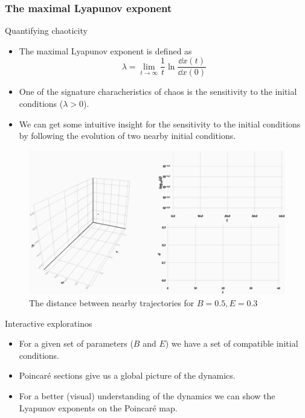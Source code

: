 \documentclass{beamer}
\begin{document}
\subsubsection{The maximal Lyapunov exponent}


\begin{frame}{Quantifying chaoticity}
	\begin{itemize}
		\item The maximal Lyapunov exponent is defined as
		\[
			\lambda = \lim\limits_{t \to \infty} \frac{1}{t} \ln{\frac{\dd{x}(t)}{\dd{x}(0)}}
		\]
		\item One of the signature characheristics of chaos is the sensitivity to the initial conditions	(\(\lambda > 0\)).
		\item We can get some intuitive insight for the sensitivity to
		the initial conditions by following the evolution of two nearby
		initial conditions.
	\end{itemize}
\end{frame}



\begin{frame}
	\begin{figure}
		\includegraphics[width=\textwidth]{dist-with-log}
		\caption{The distance between nearby trajectories for \(B=0.5, E=0.3\)}
	\end{figure}
\end{frame}


\begin{frame}{Interactive exploratinos}
	\begin{itemize}
		\item For a given set of parameters ($B$ and $E$) we have
		a set of compatible initial conditions.
		\item Poincaré sections give us a global picture of the
		dynamics.
		\item For a better (visual) understanding of the dynamics
		we can show the Lyapunov exponents on the Poincaré map.
	\end{itemize}
\end{frame}
\end{document}
